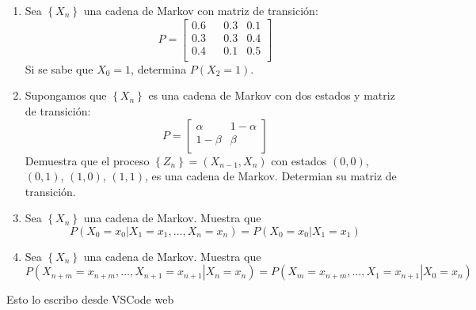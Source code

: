 \documentclass{report}
\begin{document}
\begin{enumerate}
\item Sea $\left\{X_n\right\}$ una cadena de Markov con matriz de transición:
$$P= \left[
    \begin{matrix}
        0.6 & & 0.3 & 0.1 \\
        0.3 & & 0.3 & 0.4 \\
        0.4 & & 0.1 & 0.5 \\
    \end{matrix}
    \right]
$$
Si se sabe que $X_0=1$, determina $P(X_2 = 1)$.
\item Supongamos que $\left\{X_n\right\}$ es una cadena de Markov con dos estados y matriz de transición:
$$P= \left[
    \begin{matrix}
        \alpha & 1-\alpha \\
        1-\beta & \beta \\
    \end{matrix}
    \right]
$$
Demuestra que el proceso $\left\{Z_n\right\}= (X_{n-1}, X_n)$ con estados $(0,0)$, $(0,1)$, $(1,0)$, $(1,1)$, es una cadena de Markov. Determian su matriz de transición.
\item Sea $\left\{X_n\right\}$ una cadena de Markov. Muestra que
$$
P\left(\left.X_0=x_0\right\vert X_1 = x_1, \ldots, X_n = x_n\right) = P\left(\left. X_0=x_0 \right\vert X_1 = x_1\right)
$$
\item Sea $\left\{X_n\right\}$ una cadena de Markov. Muestra que
$$
P\left(\left.X_{n+m}=x_{n+m}, \ldots, X_{n+1} = x_{n+1}\right\vert X_n = x_n\right) = P\left(\left.X_{m}=x_{n+m}, \ldots, X_{1} = x_{n+1}\right\vert X_0 = x_n\right)
$$
\end{enumerate}
Esto lo escribo desde VSCode web
\end{document}
